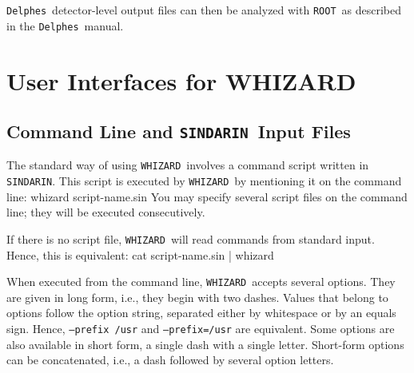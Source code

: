 \documentclass[12pt]{book}
\newenvironment{interaction}%
  {\begingroup\small
   \Verbatim}%
  {\endVerbatim
   \endgroup\noindent}
\newcommand{\ttt}[1]{\texttt{#1}}
\newcommand{\whizard}{\ttt{WHIZARD}}
\newcommand{\delphes}{\ttt{Delphes}}
\newcommand{\ROOT}{\ttt{ROOT}}
\newcommand{\sindarin}{\ttt{SINDARIN}}
\begin{document}
\delphes\ detector-level output files can then be analyzed with
\ROOT\ as described in the \delphes\ manual.


\chapter{User Interfaces for WHIZARD}
\label{chap:userint}

\section{Command Line and \sindarin\ Input Files}
\label{sec:cmdline-options}

The standard way of using \whizard\ involves a command script written
in \sindarin.  This script is executed by \whizard\ by mentioning it
on the command line:
\begin{interaction}
  whizard script-name.sin
\end{interaction}
You may specify several script files on the command line; they will be
executed consecutively.

If there is no script file, \whizard\ will read commands from standard
input.  Hence, this is equivalent:
\begin{interaction}
  cat script-name.sin | whizard
\end{interaction}

When executed from the command line, \whizard\ accepts several options.
They are given in long form, i.e., they begin with two dashes.  Values
that belong to options follow the option string, separated either by
whitespace or by an equals sign.  Hence, \ttt{--prefix /usr} and
\ttt{--prefix=/usr} are equivalent.  Some options are also available
in short form, a single dash with a single letter.  Short-form options
can be concatenated, i.e., a dash followed by several option letters.
\end{document}
